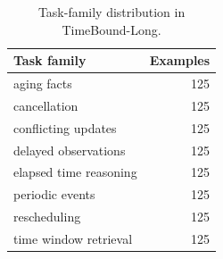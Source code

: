 \begin{table}[t]
\centering
\small
\begin{tabular}{lr}
\toprule
Task family & Examples \\
\midrule
aging facts & 125 \\
cancellation & 125 \\
conflicting updates & 125 \\
delayed observations & 125 \\
elapsed time reasoning & 125 \\
periodic events & 125 \\
rescheduling & 125 \\
time window retrieval & 125 \\
\bottomrule
\end{tabular}
\caption{Task-family distribution in TimeBound-Long.}
\label{tab:timebound_task_distribution}
\end{table}
